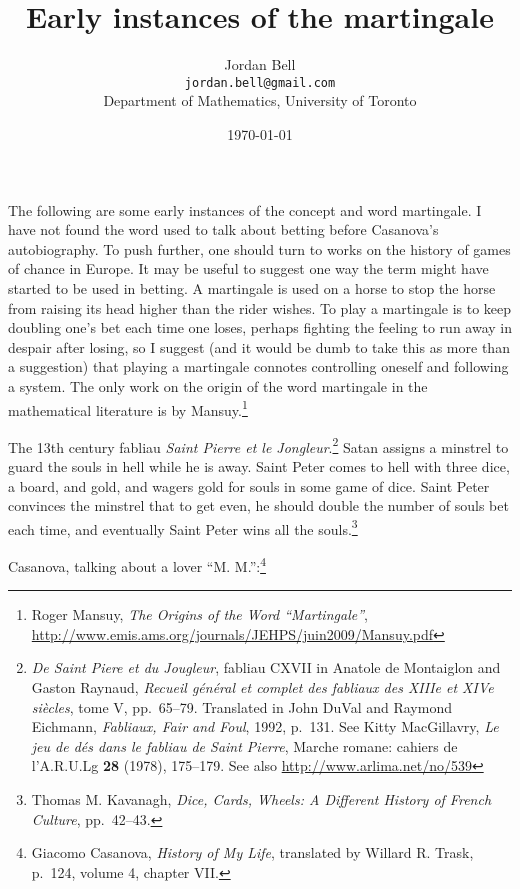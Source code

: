 \documentclass{article}
\theoremstyle{definition}
\begin{document}
\title{Early instances of the martingale}
\author{Jordan Bell\\ \texttt{jordan.bell@gmail.com}\\Department of Mathematics, University of Toronto}
\date{\today}

\maketitle

The following are some early instances of the concept and word martingale. I have not found the word used to talk about betting before
Casanova's autobiography. To push further, one should turn to works on the history of games of chance in Europe. 
It may be useful to suggest one way the term might have started to be used in betting. A martingale is used on a horse to stop the horse from raising its head higher than the rider
wishes. To play a martingale is to keep doubling one's bet each time one loses, perhaps fighting the feeling to run away in despair after losing, so
I suggest (and it would be dumb to take this as more than a suggestion) that playing a martingale connotes controlling oneself and following a system. The only work on the origin
of the word martingale in the mathematical literature  is by Mansuy.\footnote{Roger Mansuy,
{\em The Origins of the Word ``Martingale''},
\url{http://www.emis.ams.org/journals/JEHPS/juin2009/Mansuy.pdf}}


The 13th century fabliau {\em Saint Pierre et le Jongleur}.\footnote{{\em De Saint Piere et du Jougleur}, 
fabliau CXVII in Anatole de Montaiglon and 
Gaston Raynaud, {\em Recueil g\'en\'eral et complet des fabliaux des XIIIe et XIVe si\`ecles}, tome V, pp.~65--79. Translated
in John DuVal and Raymond Eichmann, {\em Fabliaux, Fair and Foul}, 1992, p.~131. See 
Kitty MacGillavry, {\em Le jeu de d\'es dans le fabliau de Saint Pierre}, 
Marche romane: cahiers de l'A.R.U.Lg \textbf{28} (1978), 175--179. See also \url{http://www.arlima.net/no/539}}
Satan assigns a minstrel to guard the souls in hell while he is away. Saint Peter 
comes to hell with three dice, a board, and gold, and wagers  gold for souls in some game of dice.
Saint Peter convinces the minstrel that to get even, he should  double the number of souls bet
each time, and eventually Saint Peter wins all the souls.\footnote{Thomas M. Kavanagh,
{\em Dice, Cards, Wheels: A Different History of French Culture}, pp.~42--43.}

Casanova, talking about a lover ``M. M.'':\footnote{Giacomo Casanova, {\em History of My Life},
translated by Willard R. Trask, p.~124, volume 4, chapter VII.}
\end{document}
